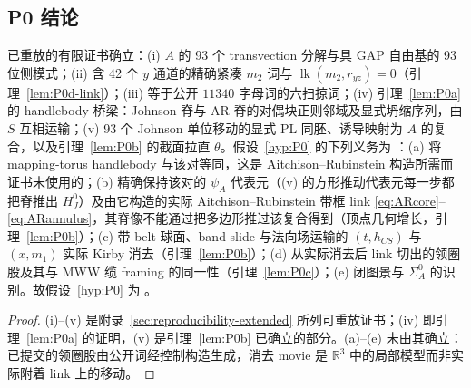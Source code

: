 \subsection{P0 结论}\label{sec:p0-conclusion}

\begin{proposition}\label{thm:P0discharge}
已重放的有限证书确立：(i) $A$ 的 93 个 transvection 分解与具 GAP 自由基的 93 位侧模式；(ii) 含 42 个 $y$ 通道的精确紧凑 $m_2$ 词与 $\operatorname{lk}(m_2,r_{yz})=0$（引理~\ref{lem:P0d-link}）；(iii) 等于公开 $11340$ 字母词的六扫掠词；(iv) 引理~\ref{lem:P0a} 的 handlebody 桥梁：Johnson 脊与 AR 脊的对偶块正则邻域及显式坍缩序列，由 $S$ 互相运输；(v) 93 个 Johnson 单位移动的显式 PL 同胚、诱导映射为 $A$ 的复合，以及引理~\ref{lem:P0b} 的截面拉直 $\theta$。假设~\ref{hyp:P0} 的下列义务为 \Open：(a) 将 mapping-torus handlebody 与该对等同，这是 Aitchison--Rubinstein 构造所需而证书未使用的；(b) 精确保持该对的 $\psi_A$ 代表元（(v) 的方形推动代表元每一步都把脊推出 $H_J^0$）及由它构造的实际 Aitchison--Rubinstein 带框 link \eqref{eq:ARcore}--\eqref{eq:ARannulus}，其脊像不能通过把多边形推过该复合得到（顶点几何增长，引理~\ref{lem:P0b}）；(c) 带 belt 球面、band slide 与法向场运输的 $(t,h_{CS})$ 与 $(x,m_1)$ 实际 Kirby 消去（引理~\ref{lem:P0b}）；(d) 从实际消去后 link 切出的领圈股及其与 MWW 缆 framing 的同一性（引理~\ref{lem:P0c}）；(e) 闭图景与 $\Sigma_A^0$ 的识别。故假设~\ref{hyp:P0} 为 \Open。
\end{proposition}

\begin{proof}
(i)--(v) 是附录~\ref{sec:reproducibility-extended} 所列可重放证书；(iv) 即引理~\ref{lem:P0a} 的证明，(v) 是引理~\ref{lem:P0b} 已确立的部分。(a)--(e) 未由其确立：已提交的领圈股由公开词经控制构造生成，消去 movie 是 $\mathbb R^3$ 中的局部模型而非实际附着 link 上的移动。
\end{proof}
